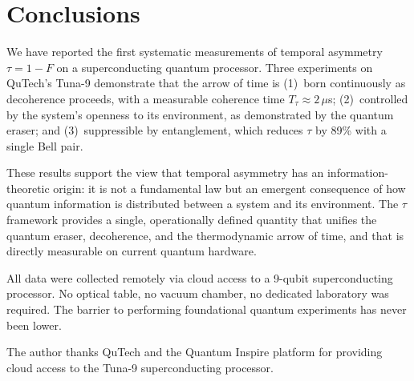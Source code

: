 \documentclass[prl,twocolumn,superscriptaddress,longbibliography,floatfix]{revtex4-2}
\newcommand{\tauasym}{\tau}
\begin{document}
\section{Conclusions}
\label{sec:conclusions}

We have reported the first systematic measurements of temporal
asymmetry $\tauasym = 1 - F$ on a superconducting quantum
processor.  Three experiments on QuTech's Tuna-9 demonstrate that
the arrow of time is (1)~born continuously as decoherence proceeds,
with a measurable coherence time $T_\tauasym \approx 2\,\mu$s;
(2)~controlled by the system's openness to its environment, as
demonstrated by the quantum eraser; and (3)~suppressible by
entanglement, which reduces $\tauasym$ by 89\% with a single Bell
pair.

These results support the view that temporal asymmetry has an
information-theoretic origin: it is not a fundamental law but an
emergent consequence of how quantum information is distributed
between a system and its environment.  The $\tauasym$ framework
provides a single, operationally defined quantity that unifies the
quantum eraser, decoherence, and the thermodynamic arrow of time,
and that is directly measurable on current quantum hardware.

All data were collected remotely via cloud access to a 9-qubit
superconducting processor.  No optical table, no vacuum chamber,
no dedicated laboratory was required.  The barrier to performing
foundational quantum experiments has never been lower.

\begin{acknowledgments}
The author thanks QuTech and the Quantum Inspire platform for
providing cloud access to the Tuna-9 superconducting processor.
\end{acknowledgments}
\end{document}
